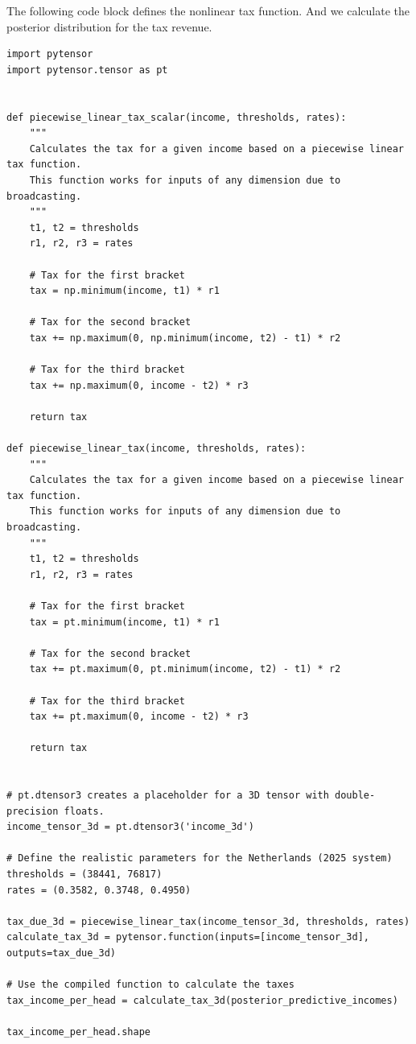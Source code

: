 \documentclass[11pt]{article}
\begin{document}
The following code block defines the nonlinear tax function. And we calculate the posterior distribution for the tax revenue.

\begin{verbatim}
import pytensor
import pytensor.tensor as pt


def piecewise_linear_tax_scalar(income, thresholds, rates):
    """
    Calculates the tax for a given income based on a piecewise linear tax function.
    This function works for inputs of any dimension due to broadcasting.
    """
    t1, t2 = thresholds
    r1, r2, r3 = rates

    # Tax for the first bracket
    tax = np.minimum(income, t1) * r1

    # Tax for the second bracket
    tax += np.maximum(0, np.minimum(income, t2) - t1) * r2

    # Tax for the third bracket
    tax += np.maximum(0, income - t2) * r3

    return tax

def piecewise_linear_tax(income, thresholds, rates):
    """
    Calculates the tax for a given income based on a piecewise linear tax function.
    This function works for inputs of any dimension due to broadcasting.
    """
    t1, t2 = thresholds
    r1, r2, r3 = rates

    # Tax for the first bracket
    tax = pt.minimum(income, t1) * r1

    # Tax for the second bracket
    tax += pt.maximum(0, pt.minimum(income, t2) - t1) * r2

    # Tax for the third bracket
    tax += pt.maximum(0, income - t2) * r3

    return tax


# pt.dtensor3 creates a placeholder for a 3D tensor with double-precision floats.
income_tensor_3d = pt.dtensor3('income_3d')

# Define the realistic parameters for the Netherlands (2025 system)
thresholds = (38441, 76817)
rates = (0.3582, 0.3748, 0.4950)

tax_due_3d = piecewise_linear_tax(income_tensor_3d, thresholds, rates)
calculate_tax_3d = pytensor.function(inputs=[income_tensor_3d], outputs=tax_due_3d)

# Use the compiled function to calculate the taxes
tax_income_per_head = calculate_tax_3d(posterior_predictive_incomes)

tax_income_per_head.shape
\end{verbatim}
\end{document}
